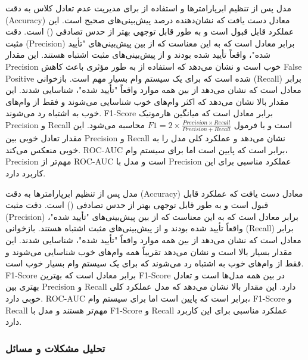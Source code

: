 \documentclass{article}
\begin{document}
مدل  پس از تنظیم ابرپارامترها و استفاده از  برای مدیریت عدم تعادل کلاس به دقت (Accuracy)  معادل  دست یافت که نشان‌دهنده درصد پیش‌بینی‌های صحیح است. این عملکرد قابل قبول است و به طور قابل توجهی بهتر از حدس تصادفی () است. دقت مثبت (Precision) برابر  معادل  است که به این معناست که از بین پیش‌بینی‌های "تأیید شده"،  واقعاً تأیید شده بودند و  از پیش‌بینی‌های مثبت اشتباه هستند. این مقدار Precision خوب است و نشان می‌دهد که استفاده از  به طور مؤثری باعث کاهش False Positive شده است که برای یک سیستم وام بسیار مهم است. بازخوانی (Recall) برابر  معادل  است که نشان می‌دهد از بین همه موارد واقعاً "تأیید شده"،  شناسایی شدند. این مقدار بالا نشان می‌دهد که اکثر وام‌های خوب شناسایی می‌شوند و فقط  از وام‌های خوب به اشتباه رد می‌شوند. F1-Score برابر  معادل  است که میانگین هارمونیک Precision و Recall است و با فرمول $F1 = 2 \times \frac{Precision \times Recall}{Precision + Recall}$ محاسبه می‌شود. این مقدار تعادل خوبی بین Precision و Recall نشان می‌دهد و عملکرد کلی مدل را به خوبی منعکس می‌کند. ROC-AUC برابر  است که پایین است اما برای سیستم وام، Precision مهم‌تر از ROC-AUC است و مدل با Precision  عملکرد مناسبی برای این کاربرد دارد.

مدل  پس از تنظیم ابرپارامترها به دقت (Accuracy)  معادل  دست یافت که عملکرد قابل قبول است و به طور قابل توجهی بهتر از حدس تصادفی () است. دقت مثبت (Precision) برابر  معادل  است که به این معناست که از بین پیش‌بینی‌های "تأیید شده"،  واقعاً تأیید شده بودند و  از پیش‌بینی‌های مثبت اشتباه هستند. بازخوانی (Recall) برابر  معادل  است که نشان می‌دهد از بین همه موارد واقعاً "تأیید شده"،  شناسایی شدند. این مقدار بسیار بالا است و نشان می‌دهد تقریباً همه وام‌های خوب شناسایی می‌شوند و فقط  از وام‌های خوب به اشتباه رد می‌شوند که برای یک سیستم وام بسیار خوب است. F1-Score برابر  معادل  است که بهترین F1-Score در بین همه مدل‌ها است و تعادل بهتری بین Precision و Recall دارد. این مقدار بالا نشان می‌دهد که مدل عملکرد کلی خوبی دارد. ROC-AUC برابر  است که پایین است اما برای سیستم وام، F1-Score و Recall مهم‌تر هستند و مدل با F1-Score  و Recall  عملکرد مناسبی برای این کاربرد دارد.

\subsubsection{تحلیل مشکلات و مسائل}
\end{document}
